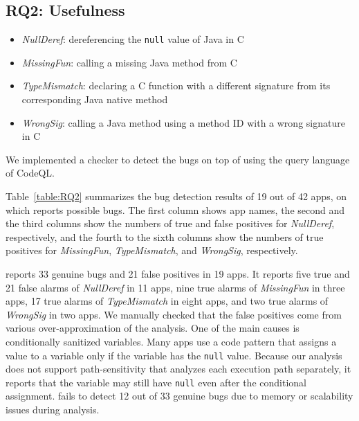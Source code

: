 \subsection{RQ2: Usefulness}
\begin{itemize}
  \item {\it NullDeref}: dereferencing the {\tt null} value of Java in C
  \item {\it MissingFun}: calling a missing Java method from C
  \item {\it TypeMismatch}: declaring a C function with a different signature
    from its corresponding Java native method
  \item {\it WrongSig}: calling a Java method using a method ID with a
    wrong signature in C
\end{itemize}
We implemented a checker to detect the bugs on top of \ours using the
query language of CodeQL. 

Table~\ref{table:RQ2} summarizes the bug detection results of 19 out of 42
apps, on which \ours reports possible bugs.  The first
column shows app names, the second and the third columns show the
numbers of true and false positives for {\it NullDeref}, respectively, and
the fourth to the sixth columns show the numbers of true positives for {\it
MissingFun}, {\it TypeMismatch}, and {\it WrongSig}, respectively.

\ours reports 33 genuine bugs and 21 false positives in 19 apps.
It reports five true and 21 false alarms of {\it NullDeref} in 11 apps,
nine true alarms of {\it MissingFun} in three apps,
17 true alarms of {\it TypeMismatch} in eight apps, and
two true alarms of {\it WrongSig} in two apps.
We manually checked that the false positives come from various over-approximation
of the analysis. One of the main causes is conditionally sanitized variables.  Many apps
use a code pattern that assigns a value to a variable only if the variable has
the {\tt null} value. Because our analysis does not support
path-sensitivity that analyzes each execution path separately, it reports that
the variable may still have {\tt null} even after the conditional assignment.
 \lees fails to detect 12 out of 33 genuine bugs
due to memory or scalability issues during analysis.

